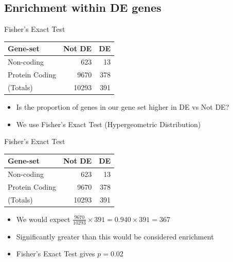\documentclass[11pt]{beamer}
\begin{document}
\subsection{Enrichment within DE genes}

\begin{frame}{Fisher's Exact Test}

	\begin{table}[ht]
	\centering
	\small
	\begin{tabular}{lrr}
		\toprule
		\textbf{Gene-set} & \textbf{Not DE} & \textbf{DE} \\ 
		\midrule
		Non-coding & 623 &  13 \\ 
		Protein Coding & 9670 & 378 \\ 
		\midrule
		(Totals) & 10293 & 391\\
	   \bottomrule
	\end{tabular}
	\end{table}
	
	\begin{itemize}
		\item Is the proportion of genes in our gene set higher in DE vs Not DE?
		\item We use Fisher's Exact Test (Hypergeometric Distribution)
	\end{itemize}
	
\end{frame}
	
\begin{frame}{Fisher's Exact Test}	

	\begin{table}[ht]
	\centering
	\small
	\begin{tabular}{lrr}
		\toprule
		\textbf{Gene-set} & \textbf{Not DE} & \textbf{DE} \\ 
		\midrule
		Non-coding & 623 &  13 \\ 
		Protein Coding & 9670 & 378 \\ 
		\midrule
		(Totals) & 10293 & 391\\
	   \bottomrule
	\end{tabular}
	\end{table}

	\begin{itemize}
		\item We would expect $\frac{9670}{10293} \times 391 = 0.940 \times 391 = 367$
		\item Significantly greater than this would be considered enrichment
		\item Fisher's Exact Test gives $p = 0.02$
	\end{itemize}
	
\end{frame}
\end{document}
